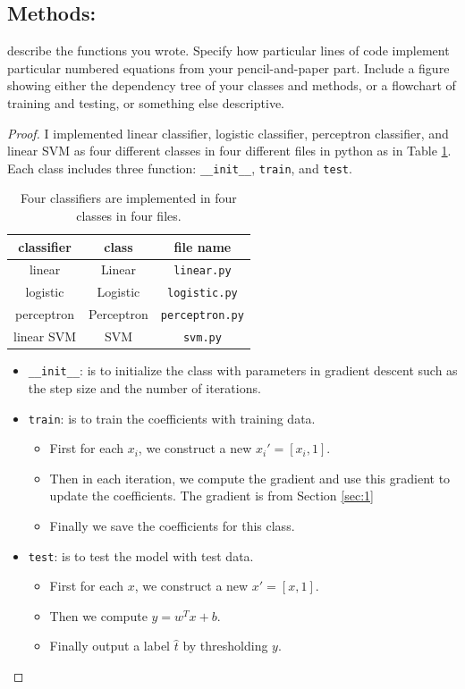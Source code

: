 \documentclass[11pt]{article}
\newcommand{\1}{\mathbf{1}}
\begin{document}
\subsection{Methods:}describe the functions you wrote. Specify how particular lines of code implement particular numbered equations from your pencil-and-paper part. Include a figure showing either the dependency tree of your classes and methods, or a flowchart of training and testing, or something else descriptive.

\begin{proof}
  I implemented linear classifier, logistic classifier, perceptron classifier, and linear SVM as four different classes in four different files in python as in Table \ref{tb:1}. Each class includes three function: {\tt \_\_init\_\_}, {\tt train}, and {\tt test}. 
  \begin{table}[htbp]
  \begin{center}
    \begin{tabular}{c|c|c}
    \hline
    {\bf classifier} & {\bf class} & {\bf file name} \\
    \hline
    linear & Linear & {\tt linear.py}\\
    logistic & Logistic & {\tt logistic.py} \\
    perceptron & Perceptron & {\tt perceptron.py}\\
    linear SVM & SVM & {\tt svm.py}\\
    \hline
    \end{tabular}
    \caption{Four classifiers are implemented in four classes in four files. \label{tb:1}}
  \end{center}
  \end{table}
  \begin{itemize}
    \item {\tt \_\_init\_\_}: is to initialize the class with parameters in gradient descent such as the step size and the number of iterations.
    \item {\tt train}: is to train the coefficients with training data. 
    \begin{itemize}
      \item First for each $x_i$, we construct a new $x_i' = [x_i, 1]$. 
      \item Then in each iteration, we compute the gradient and use this gradient to update the coefficients. The gradient is from Section \ref{sec:1}
      \item Finally we save the coefficients for this class.
    \end{itemize}
    \item {\tt test}: is to test the model with test data.
    \begin{itemize}
      \item First for each $x$, we construct a new $x' = [x,1]$.
      \item Then we compute $y = w^{T}x + b$.
      \item Finally output a label $\hat{t}$ by thresholding $y$.
    \end{itemize}
  \end{itemize}
\end{proof}
\end{document}
